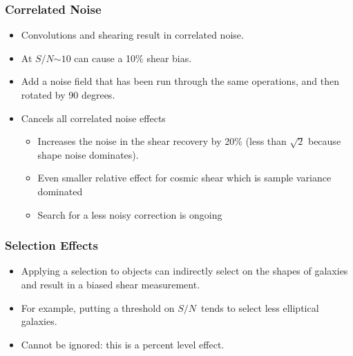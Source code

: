 \documentclass{beamer}
\newcommand{\snr}{$S/N$}
\begin{document}
\frame
{
    \frametitle{Correlated Noise}

 

    \begin{itemize}

        \item Convolutions and shearing result in correlated noise.

        \item At \snr$\sim 10$ can cause a 10\% shear bias.

        \item Add a noise field that has been run through the same
            operations, and then rotated by 90 degrees.

        \item Cancels all correlated noise effects
            
            \begin{itemize}
                \item Increases the noise in the shear recovery by 20\% (less
                    than $\sqrt 2$ because shape noise dominates).

                \item Even smaller relative effect
                    for cosmic shear which is sample variance dominated
                \item Search for a less noisy correction is ongoing
             \end{itemize}
    \end{itemize}

}



\frame
{
    \frametitle{Selection Effects}

 

    \begin{itemize}

        \item  Applying a selection to objects can indirectly select on the shapes
            of galaxies and result in a biased shear measurement.

        \item For example, putting a threshold on \snr\ tends to select less
            elliptical galaxies.

        \item Cannot be ignored: this is a percent level effect.

    \end{itemize}

}
\end{document}
